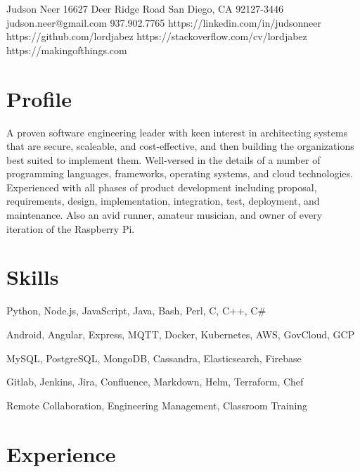 \documentclass{article}
\begin{document}
\header
  {Judson Neer}
  {16627 Deer Ridge Road}
  {San Diego, CA 92127-3446}
  {judson.neer@gmail.com}
  {937.902.7765}
  {https://linkedin.com/in/judsonneer}
  {https://github.com/lordjabez}
  {https://stackoverflow.com/cv/lordjabez}
  {https://makingofthings.com}


\section{Profile}

A proven software engineering leader with keen interest in architecting systems that are secure, scaleable, and cost-effective, and then building the organizations best suited to implement them. Well-versed in the details of a number of programming languages, frameworks, operating systems, and cloud technologies. Experienced with all phases of product development including proposal, requirements, design, implementation, integration, test, deployment, and maintenance. Also an avid runner, amateur musician, and owner of every iteration of the Raspberry Pi.


\section{Skills}

  {Python, Node.js, JavaScript, Java, Bash, Perl, C, C++, C\#}

  {Android, Angular, Express, MQTT, Docker, Kubernetes, AWS, GovCloud, GCP}

  {MySQL, PostgreSQL, MongoDB, Cassandra, Elasticsearch, Firebase}

  {Gitlab, Jenkins, Jira, Confluence, Markdown, Helm, Terraform, Chef}

  {Remote Collaboration, Engineering Management, Classroom Training}


\section{Experience}
\end{document}
